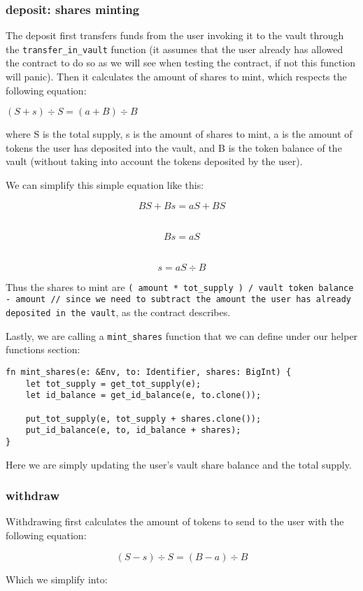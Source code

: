 \documentclass{article}
\newcommand{\inl}[1]{\lstinline{#1}}
\begin{document}
\subsubsection{deposit: shares minting}
The deposit first transfers funds from the user invoking it to the vault through the \inl{transfer_in_vault} function (it assumes that the user already has allowed the contract to do so as we will see when testing the contract, if not this function will panic). Then it calculates the amount of shares to mint, which respects the following equation:

\( ( S + s ) \div S = ( a + B ) \div B \)

where S is the total supply, s is the amount of shares to mint, a is the amount of tokens the user has deposited into the vault, and B is the token balance of the vault (without taking into account the tokens deposited by the user).

We can simplify this simple equation like this:

\[ BS + Bs = aS + BS \]
\

\[ Bs = aS \]
\

\[ s = aS \div B \]

Thus the shares to mint are \inl{( amount * tot_supply ) / vault token balance - amount // since we need to subtract the amount the user has already deposited in the vault}, as the contract describes.

Lastly, we are calling a \inl{mint_shares} function that we can define under our helper functions section:

\begin{lstlisting}
fn mint_shares(e: &Env, to: Identifier, shares: BigInt) {
    let tot_supply = get_tot_supply(e);
    let id_balance = get_id_balance(e, to.clone());

    put_tot_supply(e, tot_supply + shares.clone());
    put_id_balance(e, to, id_balance + shares);
}
\end{lstlisting}

Here we are simply updating the user's vault share balance and the total supply.

\subsubsection{withdraw}
Withdrawing first calculates the amount of tokens to send to the user with the following equation:

\[ ( S - s ) \div S = ( B - a ) \div B \]

Which we simplify into:
\end{document}
